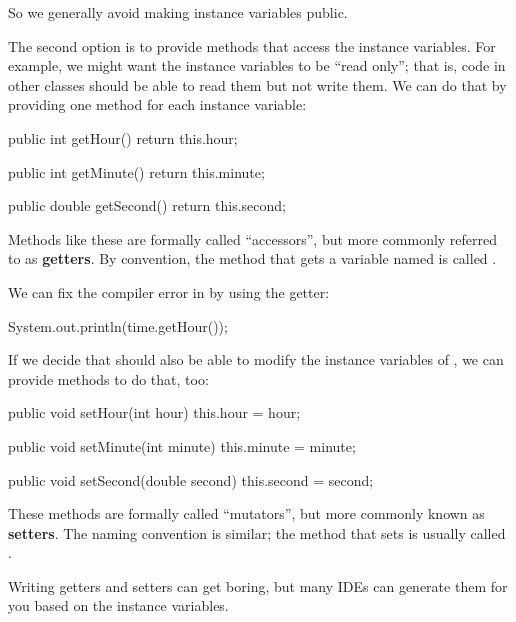 So we generally avoid making instance variables public.

The second option is to provide methods that access the instance variables.
For example, we might want the instance variables to be ``read only''; that is, code in other classes should be able to read them but not write them.
We can do that by providing one method for each instance variable:

\begin{code}
public int getHour() {
    return this.hour;
}

public int getMinute() {
    return this.minute;
}

public double getSecond() {
    return this.second;
}
\end{code}


Methods like these are formally called ``accessors'', but more commonly referred to as {\bf getters}.
By convention, the method that gets a variable named  is called .

We can fix the compiler error in  by using the getter:

\begin{code}
System.out.println(time.getHour());
\end{code}

If we decide that  should also be able to modify the instance variables of , we can provide methods to do that, too:

\begin{code}
public void setHour(int hour) {
    this.hour = hour;
}

public void setMinute(int minute) {
    this.minute = minute;
}

public void setSecond(double second) {
    this.second = second;
}
\end{code}


These methods are formally called ``mutators'', but more commonly known as {\bf setters}.
The naming convention is similar; the method that sets  is usually called .

Writing getters and setters can get boring, but many IDEs can generate them for you based on the instance variables.


